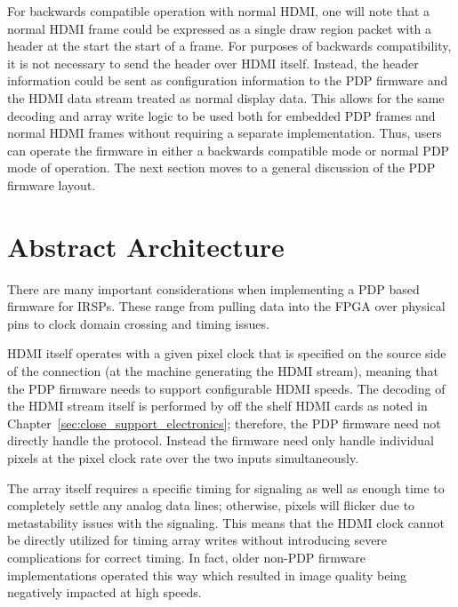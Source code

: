     For backwards compatible operation with normal HDMI, one will note that a normal HDMI frame could be expressed as a single draw region packet with a header at the start the start of a frame. For purposes of backwards compatibility, it is not necessary to send the header over HDMI itself. Instead, the header information could be sent as configuration information to the PDP firmware and the HDMI data stream treated as normal display data. This allows for the same decoding and array write logic to be used both for embedded PDP frames and normal HDMI frames without requiring a separate implementation. Thus, users can operate the firmware in either a backwards compatible mode or normal PDP mode of operation. The next section moves to a general discussion of the PDP firmware layout.

\section{Abstract Architecture}
    There are many important considerations when implementing a PDP based firmware for IRSPs. These range from pulling data into the FPGA over physical pins to clock domain crossing and timing issues.

    HDMI itself operates with a given pixel clock that is specified on the source side of the connection (at the machine generating the HDMI stream), meaning that the PDP firmware needs to support configurable HDMI speeds. The decoding of the HDMI stream itself is performed by off the shelf HDMI cards as noted in Chapter~\ref{sec:close_support_electronics}; therefore, the PDP firmware need not directly handle the protocol. Instead the firmware need only handle individual pixels at the pixel clock rate over the two inputs simultaneously.

    The array itself requires a specific timing for signaling as well as enough time to completely settle any analog data lines; otherwise, pixels will flicker due to metastability issues with the signaling. This means that the HDMI clock cannot be directly utilized for timing array writes without introducing severe complications for correct timing. In fact, older non-PDP firmware implementations operated this way which resulted in image quality being negatively impacted at high speeds.

